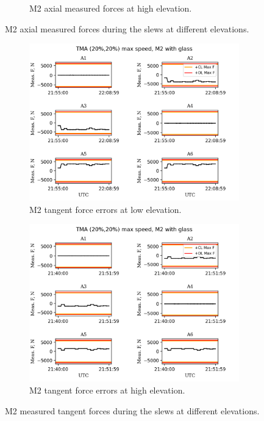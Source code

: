 \begin{figure}
\begin{subfigure}[b]{0.45\textwidth}
        \caption{M2 axial measured forces at high elevation.}
        \label{fig:block293_m2_axial_measured_forces}
    \end{subfigure}
    \caption{M2 axial measured forces during the slews at different elevations.}
    \label{fig:m2_axial_measured_forces}
\end{figure}

\begin{figure}
    \centering
    \begin{subfigure}[b]{0.45\textwidth}
        \centering
        \includegraphics[width=\textwidth]{spa/20_vel_acc_jerk/BLOCK-T227_m2_tangent_measured_forces.png}
        \caption{M2 tangent force errors at low elevation.}
        \label{fig:block227_m2_tangent_measured_forces}
    \end{subfigure}
    \hfill
    \begin{subfigure}[b]{0.45\textwidth}
        \centering
        \includegraphics[width=\textwidth]{spa/20_vel_acc_jerk/BLOCK-T293_m2_tangent_measured_forces.png}
        \caption{M2 tangent force errors at high elevation.}
        \label{fig:block293_m2_tangent_measured_forces}
    \end{subfigure}
    \caption{M2 measured tangent forces during the slews at different elevations.}
    \label{fig:m2_tangent_measured_forces}
\end{figure}

